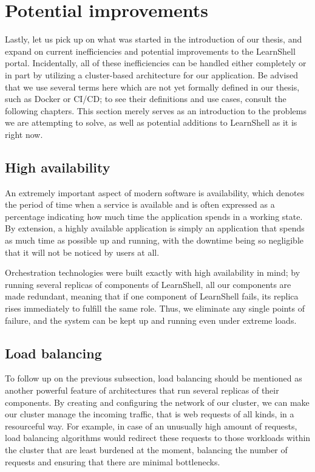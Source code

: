\documentclass[thesis=B,english]{FITthesis}[2019/12/23]
\begin{document}
\section{Potential improvements}

Lastly, let us pick up on what was started in the introduction of our thesis, and expand on current inefficiencies and potential improvements to the LearnShell portal. Incidentally, all of these inefficiencies can be handled either completely or in part by utilizing a cluster-based architecture for our application. Be advised that we use several terms here which are not yet formally defined in our thesis, such as Docker or CI/CD; to see their definitions and use cases, consult the following chapters. This section merely serves as an introduction to the problems we are attempting to solve, as well as potential additions to LearnShell as it is right now.

\subsection{High availability}

An extremely important aspect of modern software is availability, which denotes the period of time when a service is available and is often expressed as a percentage indicating how much time the application spends in a working state. \cite{what-is-high-availability} By extension, a highly available application is simply an application that spends as much time as possible up and running, with the downtime being so negligible that it will not be noticed by users at all.

Orchestration technologies were built exactly with high availability in mind; by running several replicas of components of LearnShell, all our components are made redundant, meaning that if one component of LearnShell fails, its replica rises immediately to fulfill the same role. Thus, we eliminate any single points of failure, and the system can be kept up and running even under extreme loads.

\subsection{Load balancing}

To follow up on the previous subsection, load balancing should be mentioned as another powerful feature of architectures that run several replicas of their components. By creating and configuring the network of our cluster, we can make our cluster manage the incoming traffic, that is web requests of all kinds, in a resourceful way. For example, in case of an unusually high amount of requests, load balancing algorithms would redirect these requests to those workloads within the cluster that are least burdened at the moment, balancing the number of requests and ensuring that there are minimal bottlenecks.
\end{document}
